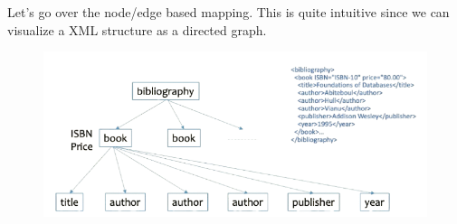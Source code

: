   Let's go over the node/edge based mapping. This is quite intuitive since we can visualize a XML structure as a directed graph. 
  \begin{figure}[H]
    \centering 
    \includegraphics[scale=0.25]{img/node_based.png}
    \caption{} 
    \label{fig:node_based}
  \end{figure}

